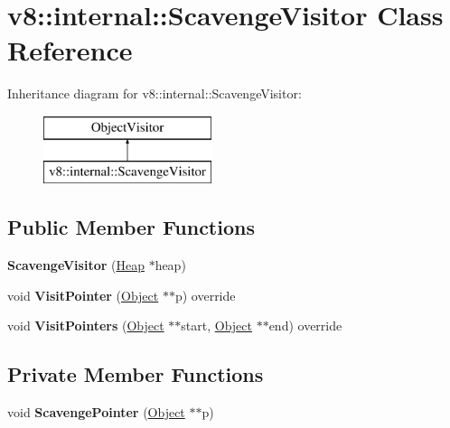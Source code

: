 \hypertarget{classv8_1_1internal_1_1_scavenge_visitor}{}\section{v8\+:\+:internal\+:\+:Scavenge\+Visitor Class Reference}
\label{classv8_1_1internal_1_1_scavenge_visitor}
Inheritance diagram for v8\+:\+:internal\+:\+:Scavenge\+Visitor\+:\begin{figure}[H]
\begin{center}
\leavevmode
\includegraphics[height=2.000000cm]{classv8_1_1internal_1_1_scavenge_visitor}
\end{center}
\end{figure}
\subsection*{Public Member Functions}
\begin{DoxyCompactItemize}
\item 
{\bfseries Scavenge\+Visitor} (\hyperlink{classv8_1_1internal_1_1_heap}{Heap} $\ast$heap)\hypertarget{classv8_1_1internal_1_1_scavenge_visitor_abb5ab9c7bd8ec5b80ebd1ebb91c6a536}{}\label{classv8_1_1internal_1_1_scavenge_visitor_abb5ab9c7bd8ec5b80ebd1ebb91c6a536}

\item 
void {\bfseries Visit\+Pointer} (\hyperlink{classv8_1_1internal_1_1_object}{Object} $\ast$$\ast$p) override\hypertarget{classv8_1_1internal_1_1_scavenge_visitor_afc41d231451a35a6116bd50f7f22966d}{}\label{classv8_1_1internal_1_1_scavenge_visitor_afc41d231451a35a6116bd50f7f22966d}

\item 
void {\bfseries Visit\+Pointers} (\hyperlink{classv8_1_1internal_1_1_object}{Object} $\ast$$\ast$start, \hyperlink{classv8_1_1internal_1_1_object}{Object} $\ast$$\ast$end) override\hypertarget{classv8_1_1internal_1_1_scavenge_visitor_a22f418bc2ee3fad2dfdf9a477793501b}{}\label{classv8_1_1internal_1_1_scavenge_visitor_a22f418bc2ee3fad2dfdf9a477793501b}

\end{DoxyCompactItemize}
\subsection*{Private Member Functions}
\begin{DoxyCompactItemize}
\item 
void {\bfseries Scavenge\+Pointer} (\hyperlink{classv8_1_1internal_1_1_object}{Object} $\ast$$\ast$p)\hypertarget{classv8_1_1internal_1_1_scavenge_visitor_aeb48ccc2c861ed840b8592011642afbb}{}\label{classv8_1_1internal_1_1_scavenge_visitor_aeb48ccc2c861ed840b8592011642afbb}

\end{DoxyCompactItemize}
